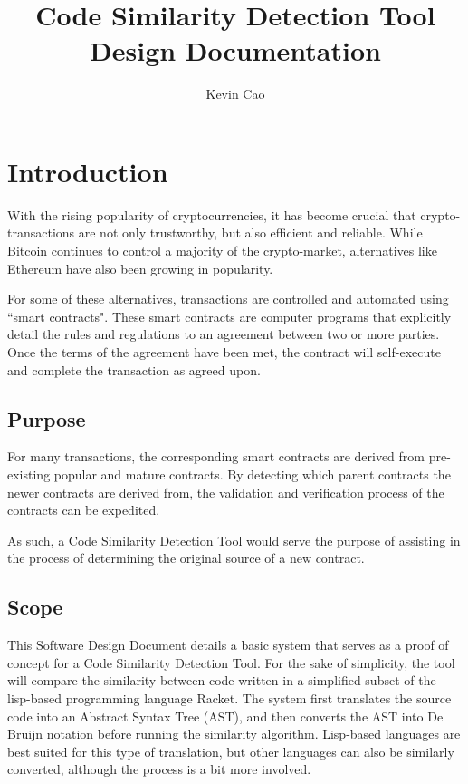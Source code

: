 \documentclass[12pt]{article}
\title{Code Similarity Detection Tool\\
Design Documentation}
\author{Kevin Cao}
\begin{document}
\maketitle

\tableofcontents

\section{Introduction}
With the rising popularity of cryptocurrencies, it has become crucial that crypto-transactions are not only trustworthy, but also efficient and reliable. While Bitcoin continues to control a majority of the crypto-market, alternatives like Ethereum have also been growing in popularity.

\hfill

For some of these alternatives, transactions are controlled and automated using ``smart contracts". These smart contracts are computer programs that explicitly detail the rules and regulations to an agreement between two or more parties. Once the terms of the agreement have been met, the contract will self-execute and complete the transaction as agreed upon.

\subsection{Purpose}
For many transactions, the corresponding smart contracts are derived from pre-existing popular and mature contracts. By detecting which parent contracts the newer contracts are derived from, the validation and verification process of the contracts can be expedited.

\hfill

As such, a Code Similarity Detection Tool would serve the purpose of assisting in the process of determining the original source of a new contract.

\subsection{Scope}

This Software Design Document details a basic system that serves as a proof of concept for a Code Similarity Detection Tool. For the sake of simplicity, the tool will compare the similarity between code written in a simplified subset of the lisp-based programming language Racket. The system first translates the source code into an Abstract Syntax Tree (AST), and then converts the AST into De Bruijn notation before running the similarity algorithm. Lisp-based languages are best suited for this type of translation, but other languages can also be similarly converted, although the process is a bit more involved.
\end{document}
